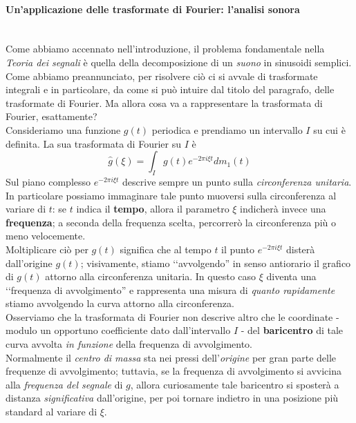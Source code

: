 \paragraph{Un'applicazione delle trasformate di Fourier: l'analisi sonora}~{}\\
Come abbiamo accennato nell'introduzione, il problema fondamentale nella \textit{Teoria dei segnali} è quella della decomposizione di un \textit{suono} in sinusoidi semplici. Come abbiamo preannunciato, per risolvere ciò ci si avvale di trasformate integrali e in particolare, da come si può intuire dal titolo del paragrafo, delle trasformate di Fourier.
Ma allora cosa va a rappresentare la trasformata di Fourier, esattamente?\\
Consideriamo una funzione $g(t)$ periodica e prendiamo un intervallo $I$ su cui è definita. La sua trasformata di Fourier su $I$ è
\begin{equation*}
	\displaystyle\hat{g}(\xi)=\displaystyle\int_{I}g(t)e^{-2\pi i\xi t}dm_1(t)
\end{equation*}
Sul piano complesso $e^{-2\pi i\xi t}$ descrive sempre un punto sulla \textit{circonferenza unitaria}. In particolare possiamo immaginare tale punto muoversi sulla circonferenza al variare di $t$: se $t$ indica il \textbf{tempo}, allora il parametro $\xi$ indicherà invece una \textbf{frequenza}; a seconda della frequenza scelta, percorrerò la circonferenza più o meno velocemente.\\
Moltiplicare ciò per $g(t)$ significa che al tempo $t$ il punto $e^{-2\pi i\xi t}$ disterà dall'origine $g(t)$; visivamente, stiamo ‘‘avvolgendo'' in senso antiorario il grafico di $g(t)$ attorno alla circonferenza unitaria. In questo caso $\xi$ diventa una ‘‘frequenza di avvolgimento'' e rappresenta una misura di \textit{quanto rapidamente} stiamo avvolgendo la curva attorno alla circonferenza.\\
Osserviamo che la trasformata di Fourier non descrive altro che le coordinate - modulo un opportuno coefficiente dato dall'intervallo $I$ - del \textbf{baricentro} di tale curva avvolta \textit{in funzione} della frequenza di avvolgimento.\\
Normalmente il \textit{centro di massa} sta nei pressi dell'\textit{origine} per gran parte delle frequenze di avvolgimento; tuttavia, se la frequenza di avvolgimento si avvicina alla \textit{frequenza del segnale} di $g$, allora curiosamente tale baricentro si sposterà a distanza \textit{significativa} dall'origine, per poi tornare indietro in una posizione più standard al variare di $\xi$.\\
